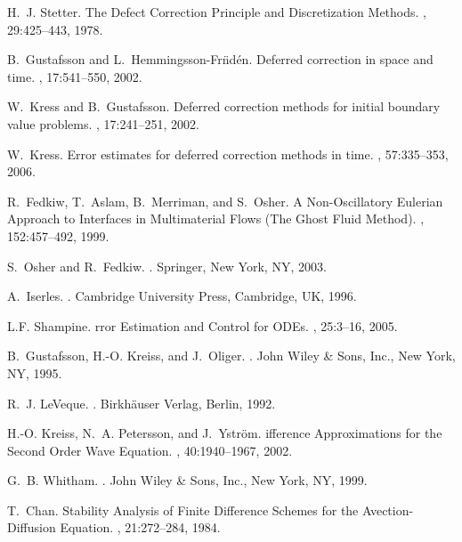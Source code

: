 \documentclass[fleqn,12pt,twoside]{article}
\begin{document}
\begin{thebibliography}{10}
H.~J. Stetter.
\newblock The {D}efect {C}orrection {P}rinciple and {D}iscretization {M}ethods.
, 29:425--443, 1978.

B.~Gustafsson and L.~Hemmingsson-Fr\"nd\'en.
\newblock Deferred correction in space and time.
, 17:541--550, 2002.

W.~Kress and B.~Gustafsson.
\newblock Deferred correction methods for initial boundary value problems.
, 17:241--251, 2002.

W.~Kress.
\newblock Error estimates for deferred correction methods in time.
, 57:335--353, 2006.

R.~Fedkiw, T.~Aslam, B.~Merriman, and S.~Osher.
\newblock A {N}on-{O}scillatory {E}ulerian {A}pproach to {I}nterfaces in
  {M}ultimaterial {F}lows ({T}he {G}host {F}luid {M}ethod).
, 152:457--492, 1999.

S.~Osher and R.~Fedkiw.
.
\newblock Springer, New York, NY, 2003.

A.~Iserles.
.
\newblock Cambridge University Press, Cambridge, UK, 1996.

L.F. Shampine.
rror {E}stimation and {C}ontrol for {ODE}s.
, 25:3--16, 2005.

B.~Gustafsson, H.-O. Kreiss, and J.~Oliger.
.
\newblock John Wiley \& Sons, Inc., New York, NY, 1995.

R.~J. LeVeque.
.
\newblock Birkh\"auser Verlag, Berlin, 1992.

H.-O. Kreiss, N.~A. Petersson, and J.~Ystr\"om.
ifference {A}pproximations for the {S}econd {O}rder {W}ave
  {E}quation.
, 40:1940--1967, 2002.

G.~B. Whitham.
.
\newblock John Wiley \& Sons, Inc., New York, NY, 1999.

T.~Chan.
\newblock Stability {A}nalysis of {F}inite {D}ifference {S}chemes for the
  {A}vection-{D}iffusion {E}quation.
, 21:272--284, 1984.


\end{thebibliography}
\end{document}

